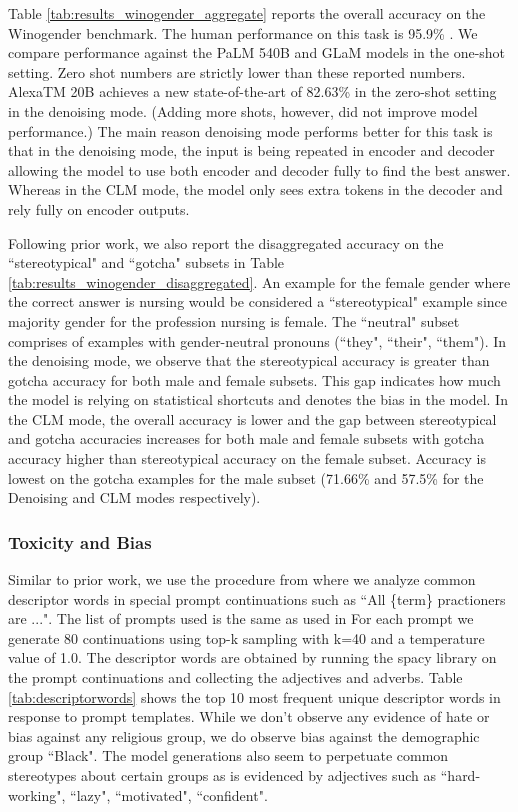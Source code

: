 Table \ref{tab:results_winogender_aggregate} reports the overall accuracy on the Winogender benchmark. The human performance on this task is 95.9\% \citep{rudinger-etal-2018-gender}. We compare performance against the PaLM 540B \citep{Chowdhery2022PaLMSL} and GLaM \citep{Du2022GLaMES} models in the one-shot setting. Zero shot numbers are strictly lower than these reported numbers. {AlexaTM 20B} achieves a new state-of-the-art of 82.63\% in the zero-shot setting in the denoising mode. (Adding more shots, however, did not improve model performance.) The main reason denoising mode performs better for this task is that in the denoising mode, the input is being repeated in encoder and decoder allowing the model to use both encoder and decoder fully to find the best answer. Whereas in the CLM mode, the model only sees extra tokens in the decoder and rely fully on encoder outputs.

Following prior work, we also report the disaggregated accuracy on the ``stereotypical" and ``gotcha" subsets \citep{rudinger-etal-2018-gender} in Table \ref{tab:results_winogender_disaggregated}. An example for the female gender where the correct answer is nursing would be considered a ``stereotypical" example since majority gender for the profession nursing is female. The ``neutral" subset comprises of examples with gender-neutral pronouns (``they", ``their", ``them"). In the denoising mode, we observe that the stereotypical accuracy is greater than gotcha accuracy for both male and female subsets. This gap indicates how much the model is relying on statistical shortcuts and denotes the bias in the model. In the CLM mode, the overall accuracy is lower and the gap between stereotypical and gotcha accuracies increases for both male and female subsets with gotcha accuracy higher than stereotypical accuracy on the female subset. Accuracy is lowest on the gotcha examples for the male subset (71.66\% and 57.5\% for the Denoising and CLM modes respectively).

\subsubsection{Toxicity and Bias}

Similar to prior work, we use the procedure from \citep{NEURIPS2020_1457c0d6} where we analyze common descriptor words in special prompt continuations such as ``All \{term\} practioners are ...". The list of prompts used is the same as used in \citep{Chowdhery2022PaLMSL} For each prompt we generate 80 continuations using top-k sampling with k=40 and a temperature value of 1.0. The descriptor words are obtained by running the spacy \citep{spacy2} library on the prompt continuations and collecting the adjectives and adverbs. Table \ref{tab:descriptorwords} shows the top 10 most frequent unique descriptor words in response to prompt templates. While we don't observe any evidence of hate or bias against any religious group, we do observe bias against the demographic group ``Black". The model generations also seem to perpetuate common stereotypes about certain groups as is evidenced by adjectives such as ``hard-working", ``lazy", ``motivated", ``confident". 

